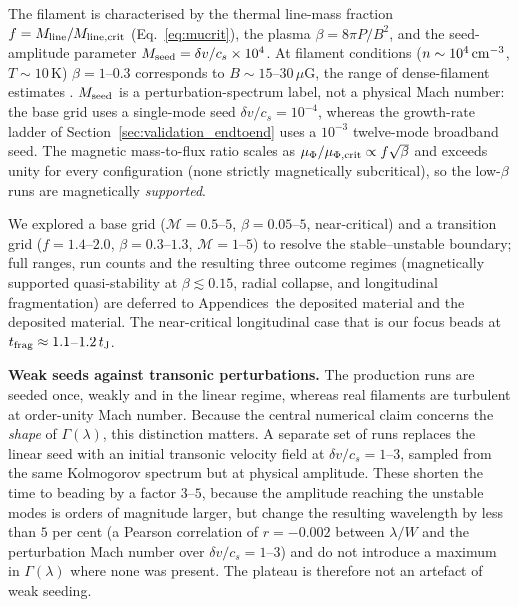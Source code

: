 \documentclass[usenatbib,twoside,twocolumn]{mnras}
\begin{document}
The filament is characterised by the thermal line-mass fraction $f=M_{\rm line}/M_{\rm line,crit}$ (Eq.~\ref{eq:mucrit}), the plasma $\beta=8\pi P/B^2$, and the seed-amplitude parameter $M_{\rm seed}=\delta v/c_s\times10^{4}$. At filament conditions ($n\sim10^4\,{\rm cm^{-3}}$, $T\sim10$\,K) $\beta=1$--$0.3$ corresponds to $B\sim15$--$30\,\mu$G, the range of dense-filament estimates \citep{Crutcher2012}. $M_{\rm seed}$ is a perturbation-spectrum label, not a physical Mach number: the base grid uses a single-mode seed $\delta v/c_s=10^{-4}$, whereas the growth-rate ladder of Section~\ref{sec:validation_endtoend} uses a $10^{-3}$ twelve-mode broadband seed. The magnetic mass-to-flux ratio scales as $\mu_\Phi/\mu_{\Phi,\rm crit}\propto f\sqrt{\beta}$ and exceeds unity for every configuration (none strictly magnetically subcritical), so the low-$\beta$ runs are magnetically \emph{supported}.

We explored a base grid ($\mathcal{M}=0.5$--$5$, $\beta=0.05$--$5$, near-critical) and a transition grid ($f=1.4$--$2.0$, $\beta=0.3$--$1.3$, $\mathcal{M}=1$--$5$) to resolve the stable--unstable boundary; full ranges, run counts and the resulting three outcome regimes (magnetically supported quasi-stability at $\beta\lesssim0.15$, radial collapse, and longitudinal fragmentation) are deferred to Appendices~the deposited material and the deposited material. The near-critical longitudinal case that is our focus beads at $t_{\rm frag}\approx1.1$--$1.2\,t_{\rm J}$.

\smallskip\noindent\textbf{Weak seeds against transonic perturbations.} The production runs are seeded once, weakly and in the linear regime, whereas real filaments are turbulent at order-unity Mach number. Because the central numerical claim concerns the \emph{shape} of $\Gamma(\lambda)$, this distinction matters. A separate set of runs replaces the linear seed with an initial transonic velocity field at $\delta v/c_s=1$--$3$, sampled from the same Kolmogorov spectrum but at physical amplitude. These shorten the time to beading by a factor $3$--$5$, because the amplitude reaching the unstable modes is orders of magnitude larger, but change the resulting wavelength by less than $5$ per cent (a Pearson correlation of $r=-0.002$ between $\lambda/W$ and the perturbation Mach number over $\delta v/c_s=1$--$3$) and do not introduce a maximum in $\Gamma(\lambda)$ where none was present. The plateau is therefore not an artefact of weak seeding.
\end{document}
